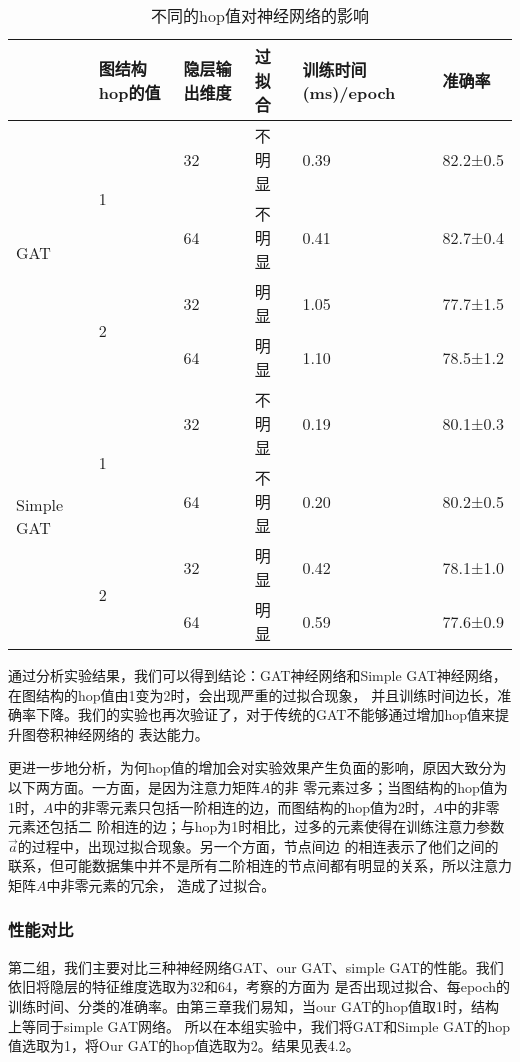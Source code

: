 \begin{table}[]
    \centering
    \caption{不同的hop值对神经网络的影响}
    \begin{tabular}{|l|l|l|l|l|l|}
    \hline
                         & 图结构hop的值           & 隐层输出维度 & 过拟合 & 训练时间(ms)/epoch & 准确率      \\ \hline
    \multirow{4}{*}{GAT} & \multirow{2}{*}{1} & 32     & 不明显 & 0.39            & 82.2±0.5 \\ \cline{3-6}
                         &                    & 64     & 不明显 & 0.41            & 82.7±0.4 \\ \cline{2-6}
                         & \multirow{2}{*}{2} & 32     & 明显   & 1.05            & 77.7±1.5 \\ \cline{3-6}
                         &                    & 64     & 明显   & 1.10            & 78.5±1.2 \\ \hline
    \multirow{4}{*}{Simple GAT} & \multirow{2}{*}{1} & 32     & 不明显 & 0.19     & 80.1±0.3 \\ \cline{3-6}
                         &                    & 64     & 不明显 & 0.20            & 80.2±0.5 \\ \cline{2-6}
                         & \multirow{2}{*}{2} & 32     & 明显   & 0.42             & 78.1±1.0 \\ \cline{3-6}
                         &                    & 64     & 明显   & 0.59             & 77.6±0.9 \\ \hline                    
    \end{tabular}
\end{table}

通过分析实验结果，我们可以得到结论：GAT神经网络和Simple GAT神经网络，在图结构的hop值由1变为2时，会出现严重的过拟合现象，
并且训练时间边长，准确率下降。我们的实验也再次验证了，对于传统的GAT不能够通过增加hop值来提升图卷积神经网络的
表达能力。

更进一步地分析，为何hop值的增加会对实验效果产生负面的影响，原因大致分为以下两方面。一方面，是因为注意力矩阵$A$的非
零元素过多；当图结构的hop值为1时，$A$中的非零元素只包括一阶相连的边，而图结构的hop值为2时，$A$中的非零元素还包括二
阶相连的边；与hop为1时相比，过多的元素使得在训练注意力参数$ \vec{a} $的过程中，出现过拟合现象。另一个方面，节点间边
的相连表示了他们之间的联系，但可能数据集中并不是所有二阶相连的节点间都有明显的关系，所以注意力矩阵$A$中非零元素的冗余，
造成了过拟合。

\subsubsection{性能对比}
第二组，我们主要对比三种神经网络GAT、our GAT、simple GAT的性能。我们依旧将隐层的特征维度选取为32和64，考察的方面为
是否出现过拟合、每epoch的训练时间、分类的准确率。由第三章我们易知，当our GAT的hop值取1时，结构上等同于simple GAT网络。
所以在本组实验中，我们将GAT和Simple GAT的hop值选取为1，将Our GAT的hop值选取为2。结果见表4.2。

